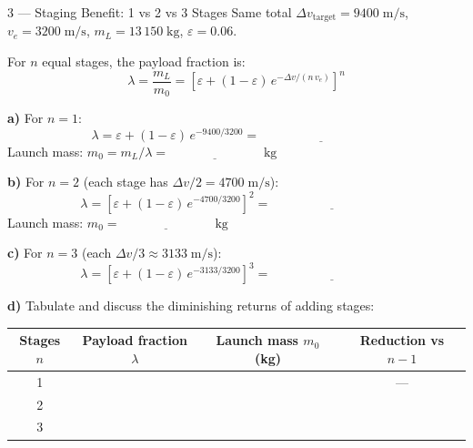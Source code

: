 \documentclass[12pt, a4paper]{article}
\begin{document}
\begin{exercisebox}{3 — Staging Benefit: 1 vs 2 vs 3 Stages}
Same total $\Delta v_\text{target} = 9400\;\text{m/s}$, $v_e = 3200\;\text{m/s}$, $m_L = 13\,150\;\text{kg}$, $\varepsilon = 0.06$.

For $n$ equal stages, the payload fraction is:
\[
  \lambda = \frac{m_L}{m_0} = \left[\varepsilon + (1-\varepsilon)\,e^{-\Delta v / (n\,v_e)}\right]^n
\]

\textbf{a)} For $n=1$:
\[
  \lambda = \varepsilon + (1-\varepsilon)\,e^{-9400/3200} = \underline{\hspace{4cm}}
\]
Launch mass: $m_0 = m_L / \lambda = \underline{\hspace{3cm}}\;\text{kg}$

\textbf{b)} For $n=2$ (each stage has $\Delta v/2 = 4700\;\text{m/s}$):
\[
  \lambda = \left[\varepsilon + (1-\varepsilon)\,e^{-4700/3200}\right]^2 = \underline{\hspace{4cm}}
\]
Launch mass: $m_0 = \underline{\hspace{3cm}}\;\text{kg}$

\textbf{c)} For $n=3$ (each $\Delta v/3 \approx 3133\;\text{m/s}$):
\[
  \lambda = \left[\varepsilon + (1-\varepsilon)\,e^{-3133/3200}\right]^3 = \underline{\hspace{4cm}}
\]

\textbf{d)} Tabulate and discuss the diminishing returns of adding stages:
\begin{center}
\begin{tabular}{|c|c|c|c|}
\hline
Stages $n$ & Payload fraction $\lambda$ & Launch mass $m_0$ (kg) & Reduction vs $n-1$ \\
\hline
1 & & & — \\
\hline
2 & & & \\
\hline
3 & & & \\
\hline
\end{tabular}
\end{center}
\end{exercisebox}

\begin{solutionspace}[10cm]
\end{solutionspace}
\end{document}
